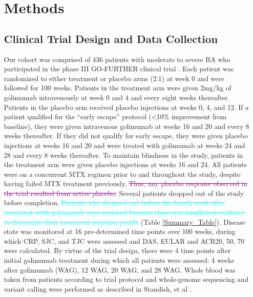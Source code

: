 
\section*{Methods}

\subsection*{Clinical Trial Design and Data Collection}

Our cohort was comprised of 436 patients with moderate to severe RA who participated in the phase III GO-FURTHER clinical trial \cite{weinblatt_radiographic_2014,weinblatt_intravenous_2013}. Each patient was randomized to either treatment or placebo arms (2:1) at week 0 and were followed for 100 weeks. Patients in the treatment arm were given 2mg/kg of golimumab intravenously at week 0 and 4 and every eight weeks thereafter. Patients in the placebo arm received placebo injections at weeks 0, 4, and 12. If a patient qualified for the “early escape” protocol (<10\% improvement from baseline), they were given intravenous golimumab at weeks 16 and 20 and every 8 weeks thereafter. If they did not qualify for early escape, they were given placebo injections at weeks 16 and 20 and were treated with golimumab at weeks 24 and 28 and every 8 weeks thereafter. To maintain blindness in the study, patients in the treatment arm were given placebo injections at weeks 16 and 24. All patients were on a concurrent MTX regimen prior to and throughout the study, despite having failed MTX treatment previously. \textcolor{purple}{\st{Thus, any placebo response observed in the trial resulted from active placebo.}} Several patients dropped out of the study before completion. \textcolor{cyan}{\st{Patients who dropped out before the fourth week after treatment with golimumab were removed because there was insufficient evidence to determine their treatment response profile}} (Table \ref{Summary_Table}). Disease state was monitored at 16 pre-determined time points over 100 weeks, during which CRP, SJC, and TJC were assessed and DAS, EULAR and ACR20, 50, 70 were calculated. By virtue of the trial design, there were 4 time points after initial golimumab treatment during which all patients were assessed: 4 weeks after golimumab (WAG), 12 WAG, 20 WAG, and 28 WAG. Whole blood was taken from patients according to trial protocol and whole-genome sequencing and variant calling were performed as described in Standish, et al \cite{standish_group-based_2015}.

